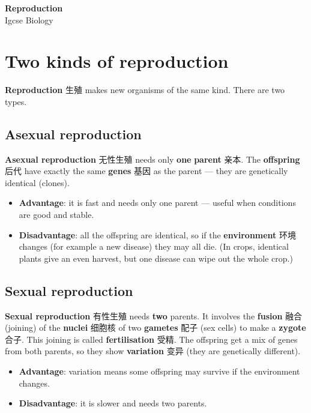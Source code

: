 \documentclass[11pt]{article}
\begin{document}
\begin{center}
  {\LARGE\bfseries Reproduction}\\[0.35em]
  {\large Igcse Biology}
\end{center}
\vspace{0.6em}

\section*{Two kinds of reproduction}

\textbf{Reproduction} 生殖 makes new organisms of the same kind. There are two types.

\subsection*{Asexual reproduction}

\textbf{Asexual reproduction} 无性生殖 needs only \textbf{one} \textbf{parent} 亲本. The \textbf{offspring} 后代 have exactly the same \textbf{genes} 基因 as the parent — they are genetically identical (clones).

\begin{itemize}
\item \textbf{Advantage}: it is fast and needs only one parent — useful when conditions are good and stable.

\item \textbf{Disadvantage}: all the offspring are identical, so if the \textbf{environment} 环境 changes (for example a new disease) they may all die. (In crops, identical plants give an even harvest, but one disease can wipe out the whole crop.)

\end{itemize}

\subsection*{Sexual reproduction}

\textbf{Sexual reproduction} 有性生殖 needs \textbf{two} parents. It involves the \textbf{fusion} 融合 (joining) of the \textbf{nuclei} 细胞核 of two \textbf{gametes} 配子 (sex cells) to make a \textbf{zygote} 合子. This joining is called \textbf{fertilisation} 受精. The offspring get a mix of genes from both parents, so they show \textbf{variation} 变异 (they are genetically different).

\begin{itemize}
\item \textbf{Advantage}: variation means some offspring may survive if the environment changes.

\item \textbf{Disadvantage}: it is slower and needs two parents.

\end{itemize}
\end{document}
